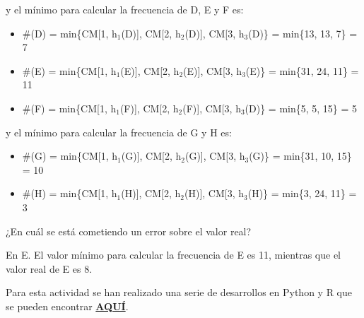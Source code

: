 \documentclass{uimppracticas}
\begin{document}
y el mínimo para calcular la frecuencia de D, E y F es:

\begin{itemize}
	\item \#(D) = min\{CM[1, h$_{1}$(D)], CM[2, h$_{2}$(D)], CM[3, h$_{3}$(D)\} = min\{13, 13, 7\} = 7 
	\item \#(E) = min\{CM[1, h$_{1}$(E)], CM[2, h$_{2}$(E)], CM[3, h$_{3}$(E)\} = min\{31, 24, 11\} = 11 
	\item \#(F) = min\{CM[1, h$_{1}$(F)], CM[2, h$_{2}$(F)], CM[3, h$_{3}$(D)\} = min\{5, 5, 15\} = 5
\end{itemize}

y el mínimo para calcular la frecuencia de G y H es:

\begin{itemize}
	\item \#(G) = min\{CM[1, h$_{1}$(G)], CM[2, h$_{2}$(G)], CM[3, h$_{3}$(G)\} = min\{31, 10, 15\} = 10 
	\item \#(H) = min\{CM[1, h$_{1}$(H)], CM[2, h$_{2}$(H)], CM[3, h$_{3}$(H)\} = min\{3, 24, 11\} = 3 
\end{itemize}

\newpage

¿En cuál se está cometiendo un error sobre el valor real?

En E. El valor mínimo para calcular la frecuencia de E es 11, mientras que el valor real de E es 8.

\lstlistoflistings

Para esta actividad se han realizado una serie de desarrollos en Python y R que se pueden encontrar \href{https://github.com/lrodrin/masterAI/tree/master/A9/Data\%20Streams/methodologies}{\textbf{AQUÍ}}.
\end{document}
